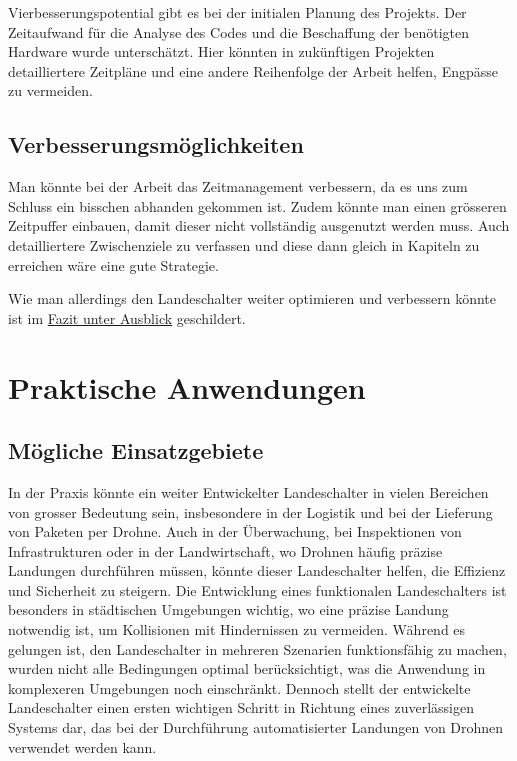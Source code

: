 Vierbesserungspotential gibt es bei der initialen Planung des Projekts. Der Zeitaufwand für die Analyse des Codes und die Beschaffung der benötigten Hardware wurde unterschätzt. Hier könnten in zukünftigen Projekten detailliertere Zeitpläne und  eine andere Reihenfolge der Arbeit helfen, Engpässe zu vermeiden.


\subsection{Verbesserungsmöglichkeiten}
Man könnte bei der Arbeit das Zeitmanagement verbessern, da es uns zum Schluss ein bisschen abhanden gekommen ist. Zudem könnte man einen grösseren Zeitpuffer einbauen, damit dieser nicht vollständig ausgenutzt werden muss.
Auch detailliertere Zwischenziele zu verfassen und diese dann gleich in Kapiteln zu erreichen wäre eine gute Strategie.

Wie man allerdings den Landeschalter weiter optimieren und verbessern könnte ist im \hyperref[sec:ausblick]{Fazit unter Ausblick} geschildert.

\section{Praktische Anwendungen}

\subsection{Mögliche Einsatzgebiete}

In der Praxis könnte ein weiter Entwickelter Landeschalter in vielen Bereichen von grosser Bedeutung sein, insbesondere in der Logistik und bei der Lieferung von Paketen per Drohne. Auch in der Überwachung, bei Inspektionen von Infrastrukturen oder in der Landwirtschaft, wo Drohnen häufig präzise Landungen durchführen müssen, könnte dieser Landeschalter helfen, die Effizienz und Sicherheit zu steigern. Die Entwicklung eines funktionalen Landeschalters ist besonders in städtischen Umgebungen wichtig, wo eine präzise Landung notwendig ist, um Kollisionen mit Hindernissen zu vermeiden. Während es gelungen ist, den Landeschalter in mehreren Szenarien funktionsfähig zu machen, wurden nicht alle Bedingungen optimal berücksichtigt, was die Anwendung in komplexeren Umgebungen noch einschränkt. Dennoch stellt der entwickelte Landeschalter einen ersten wichtigen Schritt in Richtung eines zuverlässigen Systems dar, das bei der Durchführung automatisierter Landungen von Drohnen verwendet werden kann.




